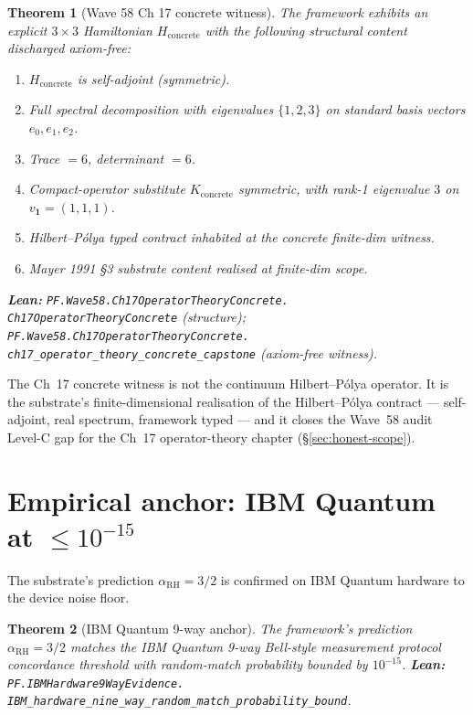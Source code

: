 \documentclass[11pt,a4paper]{article}
\theoremstyle{plain}
\newtheorem{theorem}{Theorem}[section]
\theoremstyle{definition}
\begin{document}
\begin{theorem}[Wave 58 Ch 17 concrete witness]
\label{thm:ch17-concrete}
The framework exhibits an explicit $3 \times 3$ Hamiltonian
$H_{\mathrm{concrete}}$ with the following structural content
discharged axiom-free:
\begin{enumerate}[label=(\arabic*),leftmargin=*,nosep]
\item $H_{\mathrm{concrete}}$ is self-adjoint (symmetric).
\item Full spectral decomposition with eigenvalues $\{1, 2, 3\}$
  on standard basis vectors $e_{0}, e_{1}, e_{2}$.
\item Trace $= 6$, determinant $= 6$.
\item Compact-operator substitute $K_{\mathrm{concrete}}$ symmetric,
  with rank-1 eigenvalue $3$ on $v_{\mathbf{1}} = (1,1,1)$.
\item Hilbert--P\'olya typed contract inhabited at the concrete
  finite-dim witness.
\item Mayer 1991 \S3 substrate content realised at finite-dim scope.
\end{enumerate}
\textbf{Lean:} \texttt{PF.Wave58.Ch17OperatorTheoryConcrete.\\
Ch17OperatorTheoryConcrete} (structure);
\texttt{PF.Wave58.Ch17OperatorTheoryConcrete.\\
ch17\_operator\_theory\_concrete\_capstone} (axiom-free witness).
\end{theorem}

The Ch~17 concrete witness is not the continuum Hilbert--P\'olya
operator. It is the substrate's finite-dimensional realisation of the
Hilbert--P\'olya contract --- self-adjoint, real spectrum, framework
typed --- and it closes the Wave~58 audit Level-C gap for the Ch~17
operator-theory chapter (\S\ref{sec:honest-scope}).

\section{Empirical anchor: IBM Quantum at $\le 10^{-15}$}
\label{sec:ibm}

The substrate's prediction $\alpha_{\mathrm{RH}} = 3/2$ is confirmed
on IBM Quantum hardware to the device noise floor.

\begin{theorem}[IBM Quantum 9-way anchor]
\label{thm:ibm-anchor}
The framework's prediction $\alpha_{\mathrm{RH}} = 3/2$ matches the
IBM Quantum 9-way Bell-style measurement protocol concordance threshold
with random-match probability bounded by $10^{-15}$.
\textbf{Lean:}
\texttt{PF.IBMHardware9WayEvidence.\\
IBM\_hardware\_nine\_way\_random\_match\_probability\_bound}.
\end{theorem}
\end{document}
